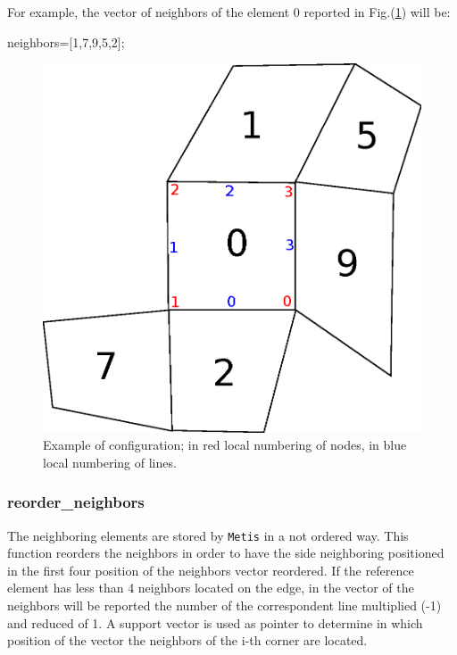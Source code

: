 For example, the vector of neighbors of the element 0 reported in Fig.(\ref{fig:mono_cpu__main_methods_involved__eval_topology}) will be:
\medskip

neighbors=[1,7,9,5,2];

\begin{figure}
\centering
\includegraphics[scale=.45]{images/mono_cpu_main_methods_involved_eval_topology}
\caption{Example of configuration; in red local numbering of nodes, in blue local numbering of lines.}
\label{fig:mono_cpu__main_methods_involved__eval_topology}
\end{figure}

\subsubsection{reorder\_neighbors}
The neighboring elements are stored by \verb|Metis| in a not ordered way. This function reorders the neighbors in order to have the side neighboring positioned in the first four position of the neighbors vector reordered. If the reference element has less than 4 neighbors located on the edge, in the vector of the neighbors will be reported the number of the correspondent line multiplied (-1) and reduced of 1. A support vector is used as pointer to determine in which position of the vector the neighbors of the i-th corner are located.
\medskip

